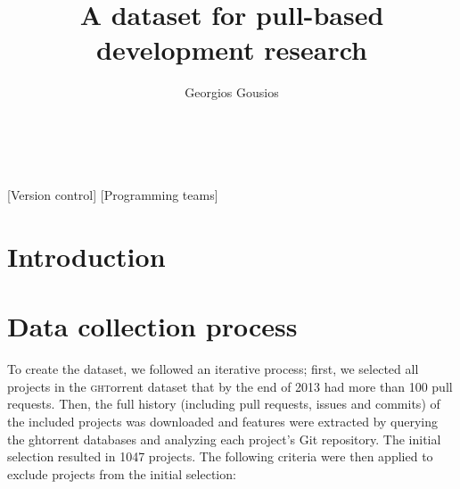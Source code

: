 \documentclass{sig-alternate}
\begin{document}
\newcommand{\todo}[1]{\textbf{TODO}\footnote{\textbf{TODO:} #1}}

\newcommand{\ghtorrent}{ \textsc{ght}orrent\xspace}
\newcommand{\api}{\textsc{api}\xspace}
\newcommand{\pullreq}{ \textsf{pullreq}\xspace}

\title{A dataset for pull-based development research}

\author{
\alignauthor
Georgios Gousios\\
       \\
       \\
}

\maketitle

\begin{abstract}


\end{abstract}

[Version control]
[Programming teams]



\section{Introduction}
\label{sec:intro}

\section{Data collection process}
\label{sec:expdata}

To create the dataset, we followed an iterative process; first, we selected all
projects in the \ghtorrent dataset that by the end of 2013 had more than 100
pull requests. Then, the full history (including pull requests, issues and
commits) of the included projects was downloaded and features were extracted by
querying the {\sc ght}orrent databases and analyzing each project's Git
repository. The initial selection resulted in 1047 projects. The following
criteria were then applied to exclude projects from the initial selection:
\end{document}
